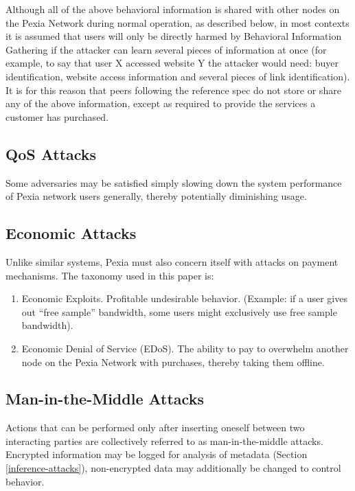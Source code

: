 \documentclass{article}
\newcommand{\mesh}{Pexia}
\begin{document}
Although all of the above behavioral information is shared with other nodes on the \mesh{} Network during normal operation, as described below, in most contexts it is assumed that users will only be directly harmed by Behavioral Information Gathering if the attacker can learn several pieces of information at once (for example, to say that user X accessed website Y the attacker would need: buyer identification, website access information and several pieces of link identification). It is for this reason that peers following the reference spec do not store or share any of the above information, except as required to provide the services a customer has purchased.

\subsection{QoS Attacks}
\label{qos}

Some adversaries may be satisfied simply slowing down the system performance of \mesh{} network users generally, thereby potentially diminishing usage.

\subsection{Economic Attacks}
\label{econ-attacks}

Unlike similar systems, \mesh{} must also concern itself with attacks on payment mechanisms. The taxonomy used in this paper is:

\begin{enumerate}
    \item Economic Exploits. Profitable undesirable behavior. (Example: if a user gives out “free sample” bandwidth, some users might exclusively use free sample bandwidth).
    \item Economic Denial of Service (EDoS). The ability to pay to overwhelm another node on the \mesh{} Network with purchases, thereby taking them offline.
\end{enumerate}

\subsection{Man-in-the-Middle Attacks}
\label{mitm}

Actions that can be performed only after inserting oneself between two interacting parties are collectively referred to as man-in-the-middle attacks. Encrypted information may be logged for analysis of metadata (Section \ref{inference-attacks}), non-encrypted data may additionally be changed to control behavior.
\end{document}

